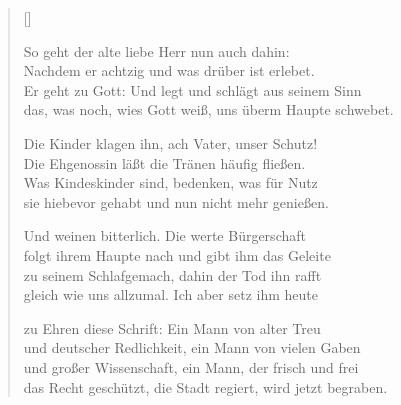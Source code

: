 \settowidth{\versewidth}{Die Kinder klagen ihn, ach Vater, unser Schutz!}
\begin{verse}[\versewidth]

 So geht der alte liebe Herr nun auch dahin:\\
Nachdem er achtzig und was drüber ist erlebet.\\
Er geht zu Gott: Und legt und schlägt aus seinem Sinn\\
das, was noch, wies Gott weiß, uns überm Haupte schwebet.

 Die Kinder klagen ihn, ach Vater, unser Schutz!\\
Die Ehgenossin läßt die Tränen häufig fließen.\\
Was Kindeskinder sind, bedenken, was für Nutz\\
sie hiebevor gehabt und nun nicht mehr genießen.

 Und weinen bitterlich. Die werte Bürgerschaft\\
folgt ihrem Haupte nach und gibt ihm das Geleite\\
zu seinem Schlafgemach, dahin der Tod ihn rafft\\
gleich wie uns allzumal. Ich aber setz ihm heute

 zu Ehren diese Schrift: Ein Mann von alter Treu\\
und deutscher Redlichkeit, ein Mann von vielen Gaben\\
und großer Wissenschaft, ein Mann, der frisch und frei\\
das Recht geschützt, die Stadt regiert, wird jetzt begraben.\\


\end{verse}
